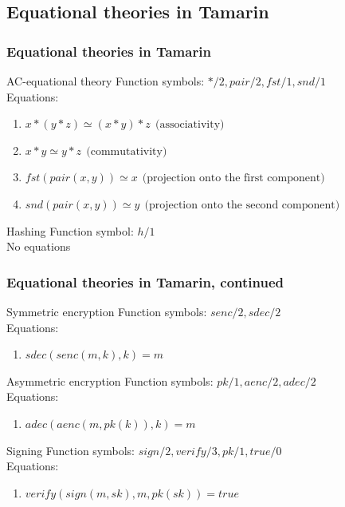 \documentclass[aspectratio=169,t,xcolor=table]{beamer}
\begin{document}
\subsection{Equational theories in Tamarin}
\begin{frame}
    \frametitle{Equational theories in Tamarin}
    \begin{block}{AC-equational theory}
        Function symbols: $*/2, pair/2, fst/1, snd/1$\\
        Equations:
        \begin{enumerate}
            \item $x * (y * z) \simeq (x * y) * z\ \ \textrm{(associativity)}$
            \item $x * y \simeq y * z\ \ \textrm{(commutativity)}$
            \item $fst(pair(x,y)) \simeq x\ \ \textrm{(projection onto the first component)}$
            \item $snd(pair(x,y)) \simeq y\ \ \textrm{(projection onto the second component)}$
        \end{enumerate}
    \end{block}

    \begin{block}{Hashing}
        Function symbol: $h/1$\\
        No equations
    \end{block}
\end{frame}

\begin{frame}
    \frametitle{Equational theories in Tamarin, continued}
    \begin{block}{Symmetric encryption}
        Function symbols: $senc/2, sdec/2$\\
        Equations:
        \begin{enumerate}
            \item $sdec(senc(m,k),k) = m$
        \end{enumerate}
    \end{block}

    \begin{block}{Asymmetric encryption}
        Function symbols: $pk/1, aenc/2, adec/2$\\
        Equations:
        \begin{enumerate}
            \item $adec(aenc(m,pk(k)),k) = m$
        \end{enumerate}
    \end{block}

    \begin{block}{Signing}
        Function symbols: $sign/2, verify/3, pk/1, true/0$\\
        Equations:
        \begin{enumerate}
            \item $verify(sign(m,sk), m, pk(sk)) = true$
        \end{enumerate}
    \end{block}
\end{frame}
\end{document}

